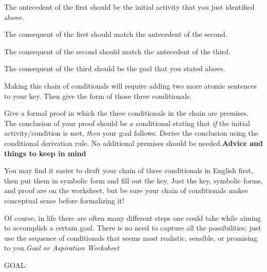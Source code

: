 \documentclass[oneside, openany]{book} %
\begin{document}
\noindent

\noindent The antecedent of the first should be the initial activity that you just identified above.

\noindent

\noindent The consequent of the first should match the antecedent of the second.

\noindent

\noindent The consequent of the second should match the antecedent of the third.

\noindent

\noindent The consequent of the third should be the goal that you stated above.

\noindent

\noindent

\noindent Making this chain of conditionals will require adding two more atomic sentences to your key. Then give the form of those three conditionals.

\noindent

\noindent Give a formal proof in which the three conditionals in the chain are premises. The conclusion of your proof should be a conditional stating that \textit{if }the initial 
activity/condition is met, \textit{then }your goal follows. Derive the conclusion using the conditional derivation rule. No additional premises should be needed.\textbf{Advice and things 
to keep in mind}

\noindent

\noindent

\noindent

\noindent You may find it easier to draft your chain of three conditionals in English first, then put them in symbolic form and fill out the key. Just the key, symbolic forms, and proof 
are on the worksheet, but be sure your chain of conditionals makes conceptual sense before formalizing it!

\noindent Of course, in life there are often many different steps one could take while aiming to accomplish a certain goal. There is no need to capture all the possibilities; just use the 
sequence of conditionals that seems most realistic, sensible, or promising to you.\textit{Goal or Aspiration Worksheet}

\noindent

\noindent

\noindent

\noindent

\noindent GOAL:

\noindent
\end{document}

